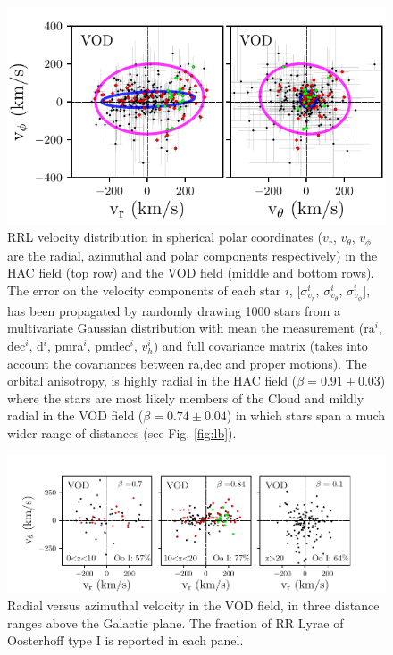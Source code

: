 \documentclass[fleqn,usenatbib]{mnras}
\begin{document}
\begin{figure}
    \includegraphics[scale=0.53]{VOD_velocities_vtheta.pdf}  
\vspace{-0.4cm}
    \caption{RRL velocity distribution in spherical polar coordinates
      ($v_{r}$, $v_{\theta}$, $v_{\phi}$ are the radial, azimuthal and
      polar components respectively) in the HAC field (top row) and
      the VOD field (middle and bottom rows). The error on the
      velocity components of each star $i $, [$\sigma^{i}_{v_{r}}$,
        $\sigma^{i}_{v_{\theta}}$, $\sigma^{i}_{v_{\phi}}$], has been
      propagated by randomly drawing 1000 stars from a multivariate
      Gaussian distribution with mean the measurement (ra$^{i}$,
      dec$^{i}$, d$^{i}$, pmra$^{i}$, pmdec$^{i}$, $v^{i}_{h}$) and
      full covariance matrix (takes into account the covariances
      between ra,dec and proper motions). The orbital anisotropy, is
      highly radial in the HAC field ($\beta = 0.91 \pm 0.03$) where
      the stars are most likely members of the Cloud and mildly radial
      in the VOD field ($\beta = 0.74 \pm 0.04$) in which stars span a
      much wider range of distances (see Fig. \ref{fig:lb}). }
    \label{fig:vel}
\end{figure}
%

%
\begin{figure}
	\hspace{-0.3cm}
	        \includegraphics[scale=0.56]{VOD_velocities_vphi_zcuts.pdf}
\vspace{-0.4cm}
   \caption{Radial versus azimuthal velocity in the VOD field, in
     three distance ranges above the Galactic plane. The fraction of
     RR Lyrae of Oosterhoff type I is reported in each panel. }
    \label{fig:VOD_vel}
\end{figure}
%
\end{document}
